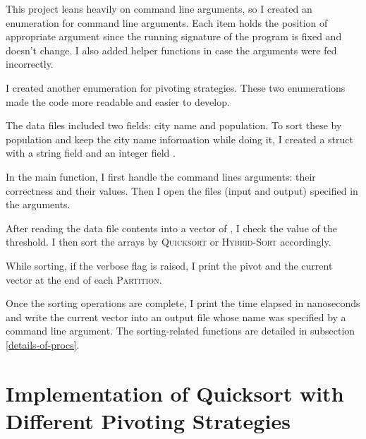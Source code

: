 This project leans heavily on command line arguments, so I created an enumeration for command line arguments. Each item holds the position of appropriate argument since the running signature of the program is fixed and doesn't change. I also added helper functions in case the arguments were fed incorrectly.

I created another enumeration for pivoting strategies. These two enumerations made the code more readable and easier to develop.

The data files included two fields: city name and population. To sort these by population and keep the city name information while doing it, I created a struct  with a string field  and an integer field .

In the main function, I first handle the command lines arguments: their correctness and their values. Then I open the files (input and output) specified in the arguments.

After reading the data file contents into a vector of , I check the value of the threshold. I then sort the arrays by \textsc{Quicksort} or \textsc{Hybrid-Sort} accordingly.

While sorting, if the verbose flag is raised, I print the pivot and the current vector at the end of each \textsc{Partition}.

Once the sorting operations are complete, I print the time elapsed in nanoseconds and write the current vector into an output file whose name was specified by a command line argument. The sorting-related functions are detailed in subsection \ref{details-of-procs}.

\section{Implementation of Quicksort with Different Pivoting Strategies}

